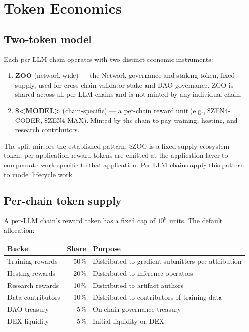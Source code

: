 \section{Token Economics}
\label{sec:economics}

\subsection{Two-token model}

Each per-LLM chain operates with two distinct economic instruments:

\begin{enumerate}[nosep]
\item \textbf{ZOO} (network-wide) --- the \Zoo{} Network governance and staking token, fixed supply, used for cross-chain validator stake and DAO governance. ZOO is shared across all per-LLM chains and is not minted by any individual chain.
\item \textbf{\$<MODEL>} (chain-specific) --- a per-chain reward unit (e.g., \$ZEN4-CODER, \$ZEN4-MAX). Minted by the chain to pay training, hosting, and research contributors.
\end{enumerate}

The split mirrors the established \Zoo{} pattern: \$ZOO is a fixed-supply ecosystem token; per-application reward tokens are emitted at the application layer to compensate work specific to that application. Per-LLM chains apply this pattern to model lifecycle work.

\subsection{Per-chain token supply}

A per-LLM chain's reward token has a fixed cap of $10^9$ units. The default allocation:

\begin{longtable}{p{4cm}rp{6cm}}
\toprule
\textbf{Bucket} & \textbf{Share} & \textbf{Purpose} \\
\midrule
\endhead
Training rewards & 50\% & Distributed to gradient submitters per attribution \\
Hosting rewards & 20\% & Distributed to inference operators \\
Research rewards & 10\% & Distributed to artifact authors \\
Data contributors & 10\% & Distributed to contributors of training data \\
DAO treasury & 5\% & On-chain governance treasury \\
DEX liquidity & 5\% & Initial liquidity on \Zoo{} DEX \\
\bottomrule
\end{longtable}

